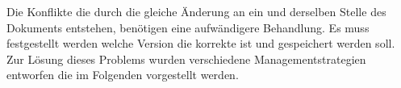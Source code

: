 Die Konflikte die durch die gleiche Änderung an ein und derselben Stelle des Dokuments entstehen, benötigen eine aufwändigere Behandlung.
Es muss festgestellt werden welche Version die korrekte ist und gespeichert werden soll.
Zur Lösung dieses Problems wurden verschiedene Managementstrategien entworfen die im Folgenden vorgestellt werden.
%
%

